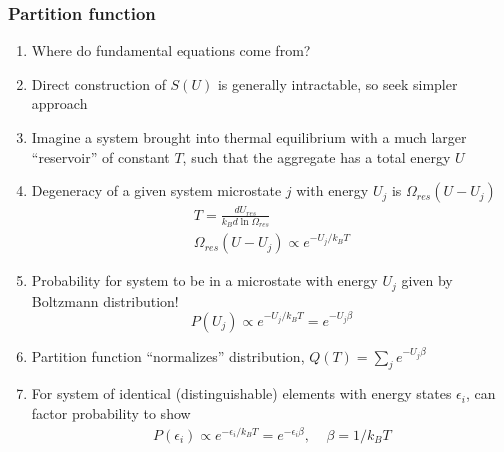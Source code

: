 \documentclass[11pt]{article}
\begin{document}
\subsubsection{Partition function}
\label{sec:orga061bf2}
\begin{enumerate}
\item Where do fundamental equations come from?
\item Direct construction of \(S(U)\) is generally intractable, so seek simpler approach
\item Imagine a system brought into thermal equilibrium with a much
larger ``reservoir'' of constant \(T\), such that the aggregate has a
total energy \(U\)
\item Degeneracy of a given system microstate \(j\) with energy \(U_j\)
is \(\Omega_{res}(U-U_j)\)
\begin{eqnarray*}
  T = \frac{dU_{res}}{k_Bd\ln\Omega_{res}} \\
  \Omega_{res}(U-U_j) \propto e^{-U_j/k_B T}
\end{eqnarray*}
\item Probability for system to be in a microstate with energy \(U_j\) given by Boltzmann
distribution!
\begin{displaymath}
  P(U_j) \propto e^{-U_j/k_B T} = e^{-U_j \beta}
\end{displaymath}
\item Partition function ``normalizes'' distribution, \(Q(T) = \sum_j
         e^{-U_j \beta}\)
\item For system of identical (distinguishable) elements with energy states \(\epsilon_i\),
can factor probability to show
\begin{eqnarray*}
  P(\epsilon_i) \propto e^{-\epsilon_i/k_B T} = e^{-\epsilon_i \beta},\
  \ \ \ \ \beta=1/k_BT
\end{eqnarray*}
\end{enumerate}
\end{document}
